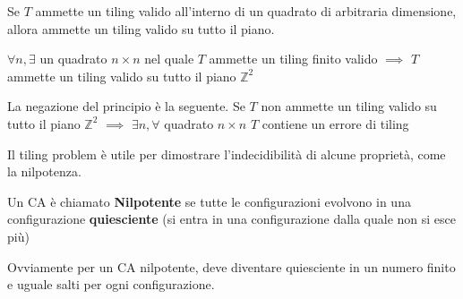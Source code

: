 \begin{definizione} 
    Se $T$ ammette un tiling valido all'interno di un quadrato di arbitraria
    dimensione, allora ammette un tiling valido su tutto il piano.

    $\forall n, \exists$ un quadrato $n\times n$ nel quale $T$ ammette un tiling 
    finito valido $\implies$ $T$ ammette un tiling valido su tutto il piano $\mathbb{Z}^2$

\end{definizione}
\begin{nota} 
    La negazione del principio è la seguente. Se $T$ non ammette un tiling valido 
    su tutto il piano $\mathbb{Z}^2$ $\implies$ $\exists n, \forall$ quadrato $n\times n$ $T$
    contiene un errore di tiling
\end{nota}

Il tiling problem è utile per dimostrare l'indecidibilità di alcune proprietà, come 
la nilpotenza.

\begin{definizione} 
    Un CA è chiamato \textbf{Nilpotente} se tutte le configurazioni evolvono
    in una configurazione \textbf{quiesciente} (si entra in una configurazione 
    dalla quale non si esce più)
\end{definizione}

Ovviamente per un CA nilpotente, deve diventare quiesciente in un numero finito
e uguale salti per ogni configurazione. 

